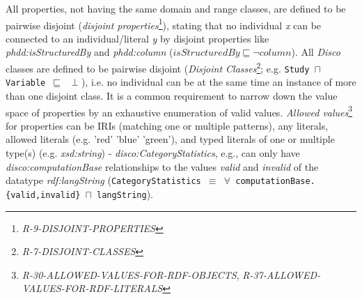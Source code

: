 \documentclass{llncs}
\newcommand{\ms}[1]{\texttt{#1}}
\begin{document}
All properties, not having the same domain and range classes, are defined to be pairwise disjoint
(\emph{disjoint properties}\footnote{\emph{R-9-DISJOINT-PROPERTIES}}), stating that no individual \emph{x} can be connected to an individual/literal \emph{y} by disjoint properties like \emph{phdd:isStructuredBy} and \emph{phdd:column} ($isStructuredBy \sqsubseteq \neg column$).
All \emph{Disco} classes are defined to be pairwise disjoint (\emph{Disjoint Classes}\footnote{\emph{R-7-DISJOINT-CLASSES}}; e.g. \ms{Study $\sqcap$ Variable $\sqsubseteq$ $\perp$}),
i.e. no individual can be at the same time an instance of more than one disjoint class.
It is a common requirement to narrow down the value space of properties by an exhaustive enumeration of valid values.  
\emph{Allowed values}\footnote{\emph{R-30-ALLOWED-VALUES-FOR-RDF-OBJECTS}, 
\emph{R-37-ALLOWED-VALUES-FOR-RDF-LITERALS}} for properties can be IRIs (matching one or multiple patterns), any literals, allowed literals (e.g. 'red' 'blue' 'green'), and typed literals of one or multiple type(s) (e.g. \emph{xsd:string}) - 
\emph{disco:CategoryStatistics}, e.g., can only have \emph{disco:computationBase} relationships to the values \emph{valid} and \emph{invalid} of the datatype \emph{rdf:langString} (\ms{CategoryStatistics $\equiv$ $\forall$ computationBase.\{valid,invalid\} $\sqcap$ langString}).
\end{document}
